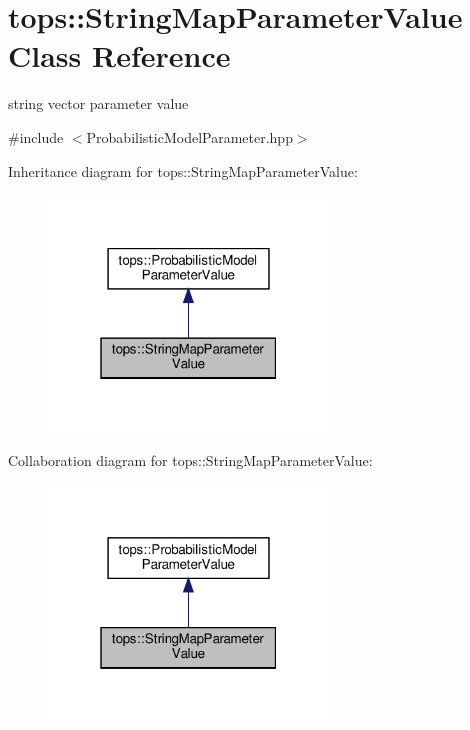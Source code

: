 \hypertarget{classtops_1_1StringMapParameterValue}{}\section{tops\+:\+:String\+Map\+Parameter\+Value Class Reference}
\label{classtops_1_1StringMapParameterValue}


string vector parameter value  




{\ttfamily \#include $<$Probabilistic\+Model\+Parameter.\+hpp$>$}



Inheritance diagram for tops\+:\+:String\+Map\+Parameter\+Value\+:
\nopagebreak
\begin{figure}[H]
\begin{center}
\leavevmode
\includegraphics[width=211pt]{classtops_1_1StringMapParameterValue__inherit__graph}
\end{center}
\end{figure}


Collaboration diagram for tops\+:\+:String\+Map\+Parameter\+Value\+:
\nopagebreak
\begin{figure}[H]
\begin{center}
\leavevmode
\includegraphics[width=211pt]{classtops_1_1StringMapParameterValue__coll__graph}
\end{center}
\end{figure}
